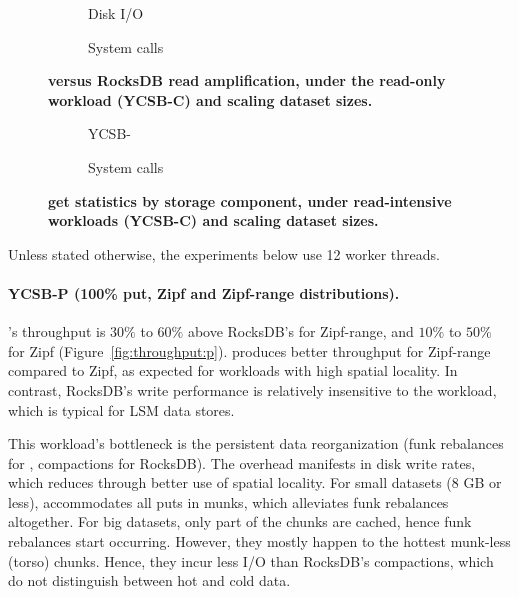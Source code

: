 \begin{figure}
\centering
\hspace{0.05\linewidth}
\begin{subfigure}{0.3\linewidth}
\caption{Disk I/O}
\label{fig:readamp:d}
\end{subfigure}
\hspace{0.05\linewidth}
\begin{subfigure}{0.25\linewidth}
\caption{System calls}
\label{fig:readamp:k}
\end{subfigure}
\caption{\bf{\sys\/ versus RocksDB read amplification, under the read-only workload (YCSB-C) and scaling dataset sizes.}}
\label{fig:readamp}
\end{figure}

\begin{figure}
\centering
\hspace{0.05\linewidth}
\begin{subfigure}{0.3\linewidth}
\caption{YCSB-}
\label{fig:readstat:dist}
\end{subfigure}
\hspace{0.05\linewidth}
\begin{subfigure}{0.25\linewidth}
\caption{System calls}
\label{fig:readstat:lat}
\end{subfigure}
\caption{\bf{\sys\/ get statistics by storage component, under read-intensive workloads (YCSB-C) and scaling dataset sizes.}}
\label{fig:readstat}
\end{figure}

Unless stated otherwise, the experiments below use 12 worker threads. 

\paragraph{YCSB-P (100\% put, Zipf and Zipf-range distributions).} 
\sys's throughput is $30\%$ to $60\%$ above RocksDB's for Zipf-range, 
and $10\%$ to $50\%$ for Zipf (Figure~\ref{fig:throughput:p}). 
\sys\/ produces better throughput for Zipf-range compared to Zipf, 
as expected for workloads with high spatial locality. In contrast, 
RocksDB's write performance is relatively insensitive to the workload, 
which is typical for LSM data stores.

This workload's bottleneck is the persistent data reorganization 
(funk rebalances for \sys, compactions for RocksDB). The overhead
manifests in disk write rates, which \sys\/ reduces through better use of spatial locality. 
For small datasets (8 GB or less), \sys\/ accommodates all puts in munks, which alleviates 
funk rebalances altogether. For big datasets, only part of the chunks are cached, hence 
funk rebalances start occurring. However, they mostly happen to the hottest munk-less 
(torso) chunks. Hence, they incur less I/O than RocksDB's compactions, which do not 
distinguish between hot and cold data. 

